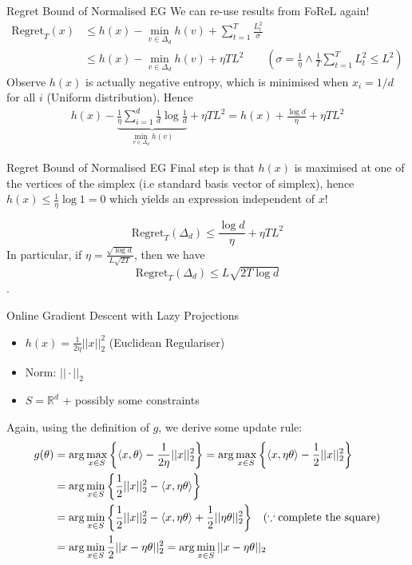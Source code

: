 \begin{frame}{Regret Bound of Normalised EG}
    We can re-use results from FoReL again!
    \begin{align*}
        \text{Regret}_T(x) &\leq h(x) - \min_{v \in \Delta_d} h(v) + \sum_{t=1}^T \frac{L_t^2}{\sigma}\\
        &\leq h(x) - \min_{v \in \Delta_d} h(v) + \eta TL^2 \qquad \left(\sigma = \frac{1}{\eta}\wedge \frac{1}{T}\sum_{t=1}^TL_t^2 \leq L^2\right)
    \end{align*}\pause
    Observe $h(x)$ is actually negative entropy, which is minimised when $x_i = 1/d$ for all $i$ (Uniform distribution). Hence
    \begin{align*}
        h(x) - \underbrace{\frac{1}{\eta}\sum_{i=1}^d \frac{1}{d} \log \frac{1}{d}}_{\min_{v \in \Delta_d} h(v)} + \eta TL^2= h(x) + \frac{\log d}{\eta}  + \eta TL^2
    \end{align*}
\end{frame}

\begin{frame}{Regret Bound of Normalised EG}
    Final step is that $h(x)$ is maximised at one of the vertices of the simplex (i.e standard basis vector of simplex), hence $h(x) \leq \frac{1}{\eta} \log 1 = 0$ which yields an expression independent of $x$!\pause

    \begin{equation}\label{eqn:neg_regret}
    \boxed{\text{Regret}_T(\Delta_d) \leq \frac{\log d}{\eta} + \eta TL^2}
\end{equation}
In particular, if $\eta = \frac{\sqrt{\log d}}{L \sqrt{2T}}$, then we have $$\text{Regret}_T(\Delta_d) \leq L\sqrt{2T \log d}$$.
\end{frame}

\begin{frame}{Online Gradient Descent with Lazy Projections}
    \begin{itemize}
    \item $h(x) = \frac{1}{2\eta}||x||_2^2$ (Euclidean Regulariser)
    \item Norm: $||\cdot||_2$
    \item $S = \mathbb R^d$ + possibly some constraints
\end{itemize}\pause
Again, using the definition of $g$, we derive some update rule:\pause
\begin{align*}
    g(\theta) &= \arg\max_{x \in S} \left\{\langle x, \theta\rangle - \frac{1}{2\eta}||x||_2^2\right\} = \arg\max_{x \in S} \left\{\langle x, \eta\theta\rangle - \frac{1}{2}||x||_2^2\right\} \\
    &= \arg\min_{x \in S} \left\{\frac{1}{2}||x||_2^2 - \langle x, \eta\theta\rangle\right\} \\
    &= \arg\min_{x \in S} \left\{\frac{1}{2}||x||_2^2 - \langle x, \eta\theta\rangle + \frac{1}{2}||\eta\theta||_2^2\right\} \hspace{0.3cm}(\because \text{complete the square)}\\
    &= \arg\min_{x \in S} \frac{1}{2}||x - \eta\theta||_2^2 =\arg\min_{x \in S} ||x - \eta\theta||_2 
\end{align*}
\end{frame}

